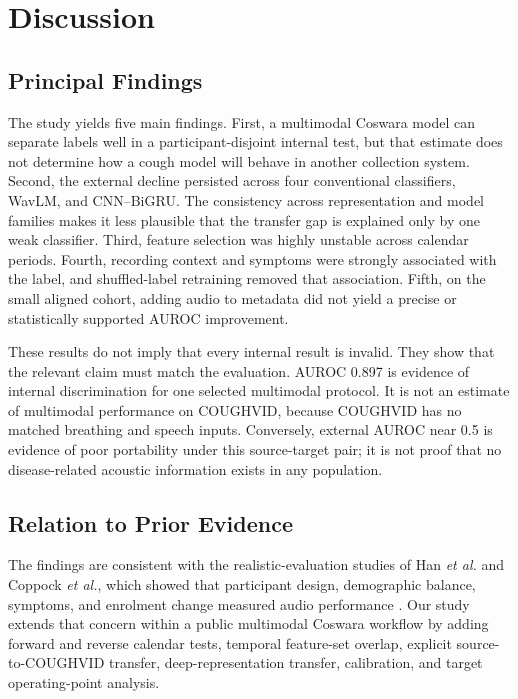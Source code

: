 \section{Discussion}

\subsection{Principal Findings}

The study yields five main findings. First, a multimodal Coswara model can
separate labels well in a participant-disjoint internal test, but that estimate
does not determine how a cough model will behave in another collection system.
Second, the external decline persisted across four conventional classifiers,
WavLM, and CNN--BiGRU. The consistency across representation and model families
makes it less plausible that the transfer gap is explained only by one weak
classifier. Third, feature selection was highly unstable across calendar
periods. Fourth, recording context and symptoms were strongly associated with
the label, and shuffled-label retraining removed that association. Fifth, on
the small aligned cohort, adding audio to metadata did not yield a precise or
statistically supported AUROC improvement.

These results do not imply that every internal result is invalid. They show
that the relevant claim must match the evaluation. AUROC 0.897 is evidence of
internal discrimination for one selected multimodal protocol. It is not an
estimate of multimodal performance on COUGHVID, because COUGHVID has no matched
breathing and speech inputs. Conversely, external AUROC near 0.5 is evidence of
poor portability under this source-target pair; it is not proof that no
disease-related acoustic information exists in any population.

\subsection{Relation to Prior Evidence}

The findings are consistent with the realistic-evaluation studies of Han
\emph{et al.} and Coppock \emph{et al.}, which showed that participant design,
demographic balance, symptoms, and enrolment change measured audio performance
\cite{han2022realistic,coppock2024audio}. Our study extends that concern within
a public multimodal Coswara workflow by adding forward and reverse calendar
tests, temporal feature-set overlap, explicit source-to-COUGHVID transfer,
deep-representation transfer, calibration, and target operating-point
analysis.

